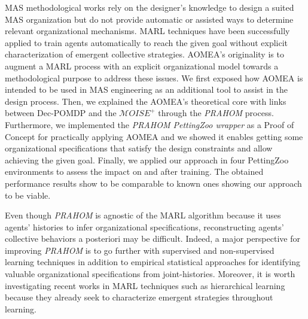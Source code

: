 \documentclass[runningheads]{llncs}
\begin{document}


MAS methodological works rely on the designer's knowledge to design a suited MAS organization but do not provide automatic or assisted ways to determine relevant organizational mechanisms.
MARL techniques have been successfully applied to train agents automatically to reach the given goal without explicit characterization of emergent collective strategies.
AOMEA's originality is to augment a MARL process with an explicit organizational model towards a methodological purpose to address these issues. We first exposed how AOMEA is intended to be used in MAS engineering as an additional tool to assist in the design process.
Then, we explained the AOMEA's theoretical core with links between Dec-POMDP and the $\mathcal{M}OISE^+$ through the \emph{PRAHOM} process.
Furthermore, we implemented the \emph{PRAHOM PettingZoo wrapper} as a Proof of Concept for practically applying AOMEA and we showed it enables getting some organizational specifications that satisfy the design constraints and allow achieving the given goal.
Finally, we applied our approach in four PettingZoo environments to assess the impact on and after training. The obtained performance results show to be comparable to known ones showing our approach to be viable.

Even though \emph{PRAHOM} is agnostic of the MARL algorithm because it uses agents' histories to infer organizational specifications, reconstructing agents' collective behaviors a posteriori may be difficult. Indeed, a major perspective for improving \emph{PRAHOM} is to go further with supervised and non-supervised learning techniques in addition to empirical statistical approaches for identifying valuable organizational specifications from joint-histories. Moreover, it is worth investigating recent works in MARL techniques such as hierarchical learning because they already seek to characterize emergent strategies throughout learning.
\end{document}
